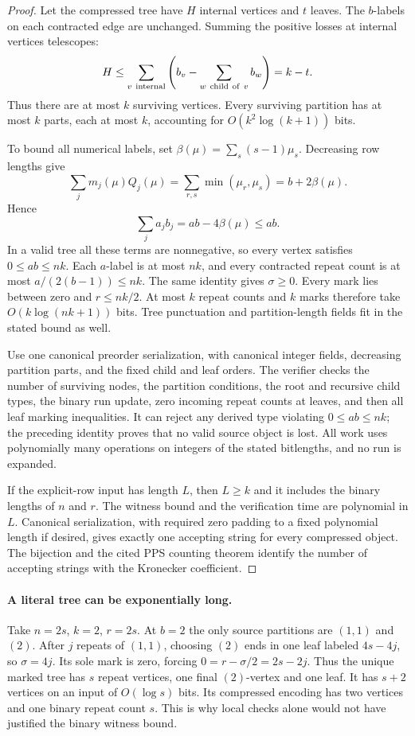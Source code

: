 \documentclass[11pt,a4paper]{article}
\theoremstyle{named}\newtheorem{finding}{Finding}[section]
\theoremstyle{definition}\newtheorem{definition}[finding]{Definition}
\theoremstyle{remark}\newtheorem{remark}[finding]{Remark}
\begin{document}
\begin{proof}
Let the compressed tree have $H$ internal vertices and $t$ leaves.
The $b$-labels on each contracted edge are unchanged. Summing the
positive losses at internal vertices telescopes:
\[
 H\le
 \sum_{v\ {\rm internal}}
       \left(b_v-\sum_{w\ {\rm child\ of}\ v}b_w\right)
 =k-t.
\]
Thus there are at most $k$ surviving vertices. Every surviving
partition has at most $k$ parts, each at most $k$, accounting for
$O(k^2\log(k+1))$ bits.

To bound all numerical labels, set
$\beta(\mu)=\sum_s(s-1)\mu_s$. Decreasing row lengths give
\[
 \sum_jm_j(\mu)Q_j(\mu)
 =\sum_{r,s}\min(\mu_r,\mu_s)
 =b+2\beta(\mu).
\]
Hence
\[
 \sum_j a_jb_j=ab-4\beta(\mu)\le ab.
\]
In a valid tree all these terms are nonnegative, so every vertex
satisfies $0\le ab\le nk$. Each $a$-label is at most $nk$, and
every contracted repeat count is at most $a/(2(b-1))\le nk$.
The same identity gives $\sigma\ge0$. Every mark lies between
zero and $r\le nk/2$. At most $k$ repeat counts and $k$ marks
therefore take $O(k\log(nk+1))$ bits. Tree punctuation and
partition-length fields fit in the stated bound as well.

Use one canonical preorder serialization, with canonical integer
fields, decreasing partition parts, and the fixed child and leaf
orders. The verifier checks the number of surviving nodes, the
partition conditions, the root and recursive child types, the
binary run update, zero incoming repeat counts at leaves, and
then all leaf marking inequalities.
It can reject any derived type violating $0\le ab\le nk$;
the preceding identity proves that no valid source object is lost.
All work uses polynomially many operations on integers of the
stated bitlengths, and no run is expanded.

If the explicit-row input has length $L$, then $L\ge k$ and it
includes the binary lengths of $n$ and $r$. The witness bound and
the verification time are polynomial in $L$. Canonical serialization,
with required zero padding to a fixed polynomial length if desired,
gives exactly one accepting string for every compressed object.
The bijection and the cited PPS counting theorem identify the
number of accepting strings with the Kronecker coefficient.
\end{proof}

\paragraph{A literal tree can be exponentially long.}
Take $n=2s$, $k=2$, $r=2s$. At $b=2$ the only source partitions
are $(1,1)$ and $(2)$. After $j$ repeats of $(1,1)$, choosing $(2)$
ends in one leaf labeled $4s-4j$, so $\sigma=4j$.
Its sole mark is zero, forcing $0=r-\sigma/2=2s-2j$.
Thus the unique marked tree has $s$ repeat vertices, one final
$(2)$-vertex and one leaf. It has $s+2$ vertices on an input of
$O(\log s)$ bits. Its compressed encoding has two vertices and
one binary repeat count $s$. This is why local checks alone would
not have justified the binary witness bound.
\end{document}
